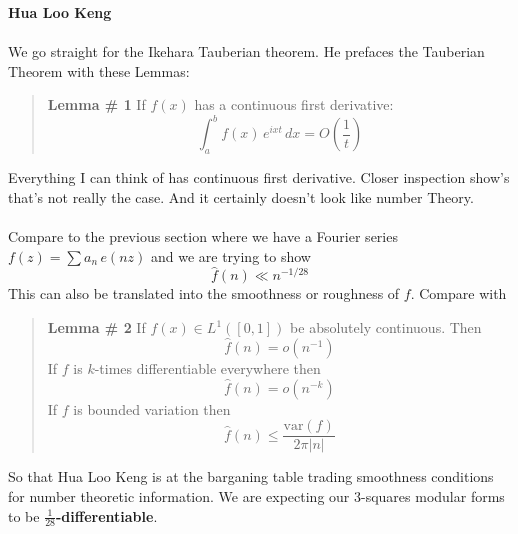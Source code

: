 \documentclass[12pt]{article}
\begin{document}
\noindent \textbf{Hua Loo Keng} \\ \\
We go straight for the Ikehara Tauberian theorem.  He prefaces the Tauberian Theorem with these Lemmas:
\begin{quotation}\textbf{Lemma \# 1} If $f(x)$ has a continuous first derivative:
$$ \int_a^b f(x) \, e^{ixt} \, dx = O \left(\frac{1}{t}\right) $$
\end{quotation}
Everything I can think of has continuous first derivative.  Closer inspection show's that's not really the case.  And it certainly doesn't look like number Theory. \\ \\
Compare to the previous section where we have a Fourier series $f(z) = \sum a_n \, e(nz)$ and we are trying to show
$$ \hat{f}(n) \ll n^{-1/28} $$
This can also be translated into the smoothness or roughness of $f$.  Compare with 
\begin{quotation}\textbf{Lemma \# 2} If $f(x) \in L^1([0,1]) $ be absolutely continuous. Then 
$$ \widehat{f}(n) = o(n^{-1}) $$
If $f$ is $k$-times differentiable everywhere then
$$ \widehat{f}(n) = o(n^{-k}) $$
If $f$ is bounded variation then
$$ \widehat{f}(n) \leq \frac{\mathrm{var}(f)}{2\pi | n|}  $$
\end{quotation}
So that Hua Loo Keng is at the barganing table trading smoothness conditions for number theoretic information.  We are expecting our 3-squares modular forms to be \textbf{$\frac{1}{28}$-differentiable}.
\end{document}
